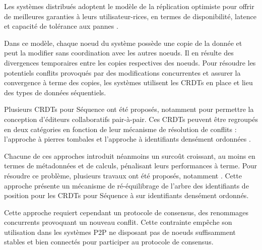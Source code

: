 Les systèmes distribués adoptent le modèle de la réplication optimiste \cite{2005-optimistic-replication-saito} pour offrir de meilleures garanties à leurs utilisateur-rices, en termes de disponibilité, latence et capacité de tolérance aux pannes \cite{pacelc2012}.

Dans ce modèle, chaque noeud du système possède une copie de la donnée et peut la modifier sans coordination avec les autres noeuds.
Il en résulte des divergences temporaires entre les copies respectives des noeuds.
Pour résoudre les potentiels conflits provoqués par des modifications concurrentes et assurer la convergence à terme des copies, les systèmes utilisent les \acp{CRDT} \cite{shapiro_2011_crdt} en place et lieu des types de données séquentiels.

Plusieurs \acp{CRDT} pour Séquence ont été proposés, notamment pour permettre la conception d'éditeurs collaboratifs pair-à-pair.
Ces \acp{CRDT} peuvent être regroupés en deux catégories en fonction de leur mécanisme de résolution de conflits : l'approche à pierres tombales \cite{2006-woot-oster,2007-wooto-weiss,2011-evaluation-crdts-ahmed-nacer,ROH2011354,briot:hal-01343941,2019-interleaving-anomalies-collaborative-editors-kleppmann} et l'approche à identifiants densément ordonnées \cite{2009-treedoc-preguica,2009-logoot-weiss,2010-logoot-undo-weiss,2013-logootsplit,2021-these-vic}.

Chacune de ces approches introduit néanmoins un surcoût croissant, au moins en termes de métadonnées et de calculs, pénalisant leurs performances à terme.
Pour résoudre ce problème, plusieurs travaux ont été proposés, notamment \cite{letia:hal-01248270, zawirski:hal-01248197}.
Cette approche présente un mécanisme de ré-équilibrage de l'arbre des identifiants de position pour les \acp{CRDT} pour Séquence à sur identifiants densément ordonnés.

Cette approche requiert cependant un protocole de consensus, des renommages concurrents provoquant un nouveau conflit.
Cette contrainte empêche son utilisation dans les systèmes \ac{P2P} ne disposant pas de noeuds suffisamment stables et bien connectés pour participer au protocole de consensus.
